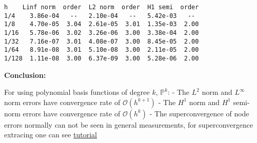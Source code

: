 \documentclass[11pt]{article}
\begin{document}
    \begin{Verbatim}[commandchars=\\\{\}]
 h    Linf norm  order  L2 norm  order  H1 semi  order
1/4    3.86e-04   --   2.10e-04   --   5.42e-03   --
1/8    4.70e-05  3.04  2.61e-05  3.01  1.35e-03  2.00
1/16   5.78e-06  3.02  3.26e-06  3.00  3.38e-04  2.00
1/32   7.16e-07  3.01  4.08e-07  3.00  8.45e-05  2.00
1/64   8.91e-08  3.01  5.10e-08  3.00  2.11e-05  2.00
1/128  1.11e-08  3.00  6.37e-09  3.00  5.28e-06  2.00

    \end{Verbatim}

    \textbf{Conclusion:}

For using polynomial basis functions of degree \(k\), \(\mathbb{P}^k\):
- The \(L^2\) norm and \(L^\infty\) norm errors have convergence rate of
\(\mathcal{O}(h^{k+1})\) - The \(H^1\) norm and \(H^1\) semi-norm errors
have convergence rate of \(\mathcal{O}(h^{k})\) - The superconvergence
of node errors normally can not be seen in general measurements, for
superconvergence extracing one can see \href{http:/}{tutorial}


    
    
    
    
\end{document}
